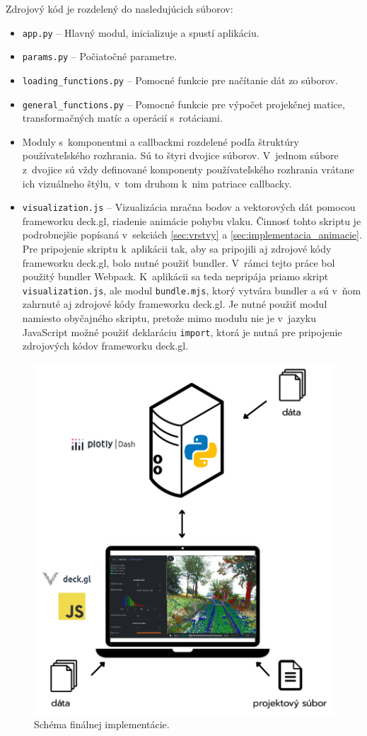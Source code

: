 Zdrojový kód je rozdelený do nasledujúcich súborov:
\begin{itemize}
    \item \texttt{app.py} -- Hlavný modul, inicializuje a spustí aplikáciu.
    \item \texttt{params.py} -- Počiatočné parametre.
    \item \texttt{loading\_functions.py} -- Pomocné funkcie pre načítanie dát zo súborov.
    \item \texttt{general\_functions.py} -- Pomocné funkcie pre výpočet projekčnej matice, transformačných matíc a operácií s~rotáciami.
    \item Moduly s~komponentmi a callbackmi rozdelené podľa štruktúry používateľského rozhrania. Sú to štyri dvojice súborov. V~jednom súbore z~dvojice sú vždy definované komponenty používateľského rozhrania vrátane ich vizuálneho štýlu, v~tom druhom k~nim patriace callbacky.
    \item \texttt{visualization.js} -- Vizualizácia mračna bodov a vektorových dát pomocou frameworku deck.gl, riadenie animácie pohybu vlaku. Činnosť tohto skriptu je podrobnejšie popísaná v~sekciách \ref{sec:vrstvy} a \ref{sec:implementacia_animacie}. Pre pripojenie skriptu k~aplikácii tak, aby sa pripojili aj zdrojové kódy frameworku deck.gl, bolo nutné použiť bundler. V~rámci tejto práce bol použitý bundler Webpack. K~aplikácii sa teda nepripája priamo skript \texttt{visualization.js}, ale modul \texttt{bundle.mjs}, ktorý vytvára bundler a sú v~ňom zahrnuté aj zdrojové kódy frameworku deck.gl. Je nutné použiť modul namiesto obyčajného skriptu, pretože mimo modulu nie je v~jazyku JavaScript možné použiť deklaráciu \texttt{import}, ktorá je nutná pre pripojenie zdrojových kódov frameworku deck.gl. 
\end{itemize}

\begin{figure}[t]
    \centering
    \includegraphics[width=0.7\linewidth]{text_prace/obrazky-figures/schema_implementacie.pdf}
    \caption{Schéma finálnej implementácie.}
    \label{fig:schema_implementacie}
\end{figure}

